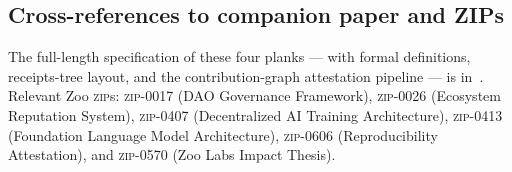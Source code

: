 \subsection{Cross-references to companion paper and ZIPs}

The full-length specification of these four planks --- with formal
definitions, receipts-tree layout, and the contribution-graph
attestation pipeline --- is in~\cite{zoo-2025-securities-and-dao}.
Relevant Zoo \textsc{zip}s: \textsc{zip-0017} (DAO Governance
Framework), \textsc{zip-0026} (Ecosystem Reputation System),
\textsc{zip-0407} (Decentralized AI Training Architecture),
\textsc{zip-0413} (Foundation Language Model Architecture),
\textsc{zip-0606} (Reproducibility Attestation), and \textsc{zip-0570}
(Zoo Labs Impact Thesis).
